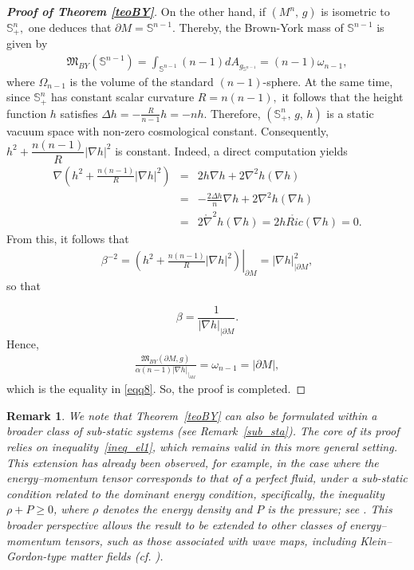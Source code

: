 \documentclass{amsart}
\newtheorem{remark}{Remark}
\numberwithin{equation}{section}
\begin{document}
\begin{proof}[{\bf Proof of Theorem \ref{teoBY}}]
		
		
		
		
		On the other hand, if $(M^n,\,g)$ is isometric to $\mathbb{S}^{n}_{+},$ one deduces that $\partial M=\mathbb{S}^{n-1}.$ Thereby, the Brown-York mass of $\mathbb{S}^{n-1}$ is given by
		\begin{eqnarray*}
			\mathfrak{M}_{BY}(\mathbb{S}^{n-1})=\int_{\mathbb{S}^{n-1}}(n-1) dA_{g_{\mathbb{S}^{n-1}}}=(n-1)\omega_{n-1},
		\end{eqnarray*}  where $\Omega_{n-1}$ is the volume of the standard $(n-1)$-sphere. At the same time, since $\mathbb{S}_+^n$ has constant scalar curvature $R=n(n-1),$ it follows that the height function $h$ satisfies $\Delta h=-\frac{R}{n-1}h=-nh$. Therefore, $(\mathbb{S}_+^n,\,g,\,h)$ is a static vacuum space with non-zero cosmological constant. Consequently, $h^2+\dfrac{n(n-1)}{R}|\nabla h|^2$ is constant. Indeed, a direct computation yields
		\begin{eqnarray*}
			\nabla\left(h^2+\frac{n(n-1)}{R}|\nabla h|^2\right)&=&2h\nabla h+2\nabla^2 h(\nabla h)\\
			&=&-\frac{2\Delta h}{n}\nabla h+2\nabla^2 h(\nabla h)\\
			&=&2\mathring{\nabla}^2 h(\nabla h)=2h\mathring{Ric}(\nabla h)=0.
		\end{eqnarray*} From this, it follows that 
		\begin{eqnarray*}
			\beta^{-2}=\left.\left(h^2+\frac{n(n-1)}{R}|\nabla h|^2\right)\right|_{\partial M}=|\nabla h|^{2}_{|{\partial M}},
		\end{eqnarray*} so that 
		
		$$\beta=\frac{1}{|\nabla h|_{|{\partial M}}}.$$ Hence,
		\begin{eqnarray*}
			\frac{\mathfrak{M}_{BY}(\partial M,g)}{\alpha (n-1)|\nabla h|_{|_{\partial M}}}=\omega_{n-1}=|\partial M|,
		\end{eqnarray*} which is the equality in \eqref{eqq8}. So, the proof is completed.
	\end{proof}
	

	

\begin{remark}
We note that Theorem~\ref{teoBY} can also be formulated within a broader class of sub-static systems (see Remark~\ref{sub_sta}). The core of its proof relies on inequality~\eqref{ineq_el1}, which remains valid in this more general setting. This extension has already been observed, for example, in the case where the energy–momentum tensor corresponds to that of a perfect fluid, under a sub-static condition related to the dominant energy condition, specifically, the inequality $\rho + P \geq 0$, where $\rho$ denotes the energy density and $P$ is the pressure; see \cite[Theorem~2]{costa}. This broader perspective allows the result to be extended to other classes of energy–momentum tensors, such as those associated with wave maps, including Klein–Gordon-type matter fields (cf. \cite[Section 2]{cfmr}).
\end{remark}
\end{document}
